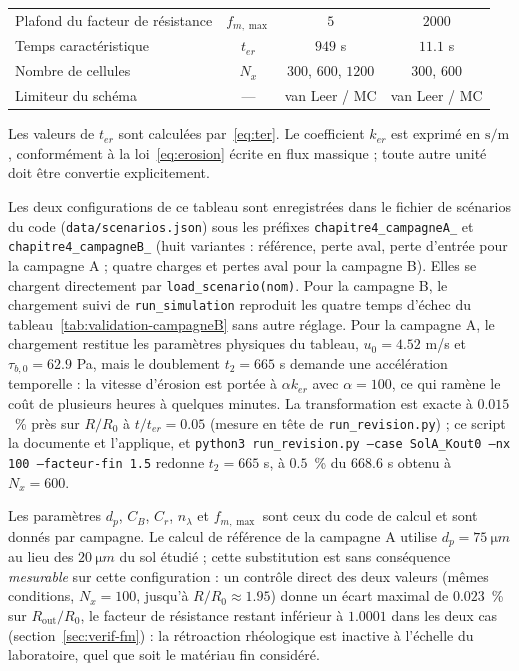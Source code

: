 \documentclass[11pt,a4paper]{report}
\newcommand{\ter}{{t_{er}}}
\begin{document}
\begin{table}[H]
\begin{tabular}{lccc}
Plafond du facteur de résistance & \(f_{m,\max}\) & \(5\) & \(2000\) \\
Temps caractéristique & \(\ter\) & \(949\) s & \(11.1\) s \\
Nombre de cellules & \(N_x\) & \(300\), \(600\), \(1200\) & \(300\), \(600\) \\
Limiteur du schéma & --- & van Leer / MC & van Leer / MC \\
\bottomrule
\end{tabular}
\begin{tablenotes}
\small
\item Les valeurs de \(\ter\) sont calculées par~\eqref{eq:ter}. Le coefficient \(k_{er}\) est exprimé en
\(\mathrm{s/m}\), conformément à la loi~\eqref{eq:erosion} écrite en flux massique ; toute autre unité doit
être convertie explicitement.
\item Les deux configurations de ce tableau sont enregistrées dans le fichier de scénarios du code
(\texttt{data/scenarios.json}) sous les préfixes \texttt{chapitre4\_campagneA\_} et
\texttt{chapitre4\_campagneB\_} (huit variantes : référence, perte aval, perte d'entrée pour la campagne A ;
quatre charges et pertes aval pour la campagne B). Elles se chargent directement par
\texttt{load\_scenario(nom)}. Pour la campagne B, le chargement suivi de \texttt{run\_simulation}
reproduit les quatre temps d'échec du tableau~\ref{tab:validation-campagneB} sans autre réglage. Pour la
campagne A, le chargement restitue les paramètres physiques du tableau, \(u_0 = 4.52\) m/s et
\(\tau_{b,0} = 62.9\) Pa, mais le doublement \(t_2 = 665\) s demande une accélération temporelle : la
vitesse d'érosion est portée à \(\alpha k_{er}\) avec \(\alpha = 100\), ce qui ramène le coût de
plusieurs heures à quelques minutes. La transformation est exacte à \(0.015\)~\% près sur \(R/R_0\) à \(t/\ter = 0.05\)
(mesure en tête de \texttt{run\_revision.py}) ; ce script la documente et l'applique, et
\texttt{python3 run\_revision.py --case SolA\_Kout0 --nx 100 --facteur-fin 1.5} redonne
\(t_2 = 665\) s, à \(0.5\)~\% du \(668.6\) s obtenu à \(N_x = 600\).
\item Les paramètres \(d_p\), \(C_B\), \(C_r\), \(n_\lambda\) et \(f_{m,\max}\) sont ceux du
code de calcul et sont donnés par campagne. Le calcul de référence de la campagne A utilise
\(d_p = 75\ \si{\micro m}\) au lieu des \(20\ \si{\micro m}\) du sol étudié ; cette substitution est sans
conséquence \emph{mesurable} sur cette configuration : un contrôle direct des deux valeurs (mêmes
conditions, \(N_x = 100\), jusqu'à \(R/R_0 \approx 1.95\)) donne un écart maximal de \(0.023\)~\%
sur \(R_{\mathrm{out}}/R_0\), le facteur de résistance restant inférieur à \(1.0001\) dans les deux cas
(section~\ref{sec:verif-fm}) : la rétroaction rhéologique est inactive à l'échelle du laboratoire, quel que
soit le matériau fin considéré.
\end{tablenotes}
\end{table}
\end{document}
